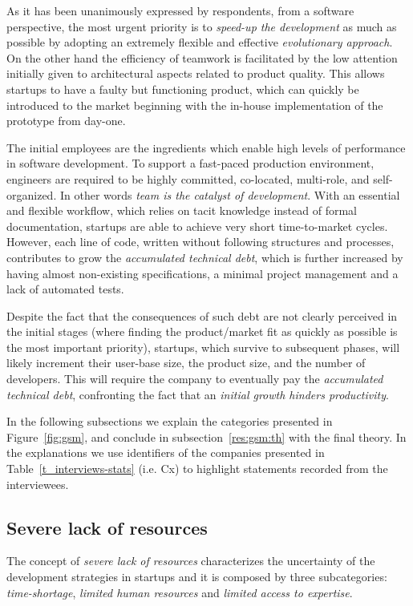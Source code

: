 \documentclass[10pt,journal,letterpaper,compsoc]{IEEEtran}
\begin{document}
As it has been unanimously expressed by respondents, from a software
perspective, the most urgent priority is to \textit{speed-up the development} as
much as possible by adopting an extremely flexible and effective
\textit{evolutionary approach}. On the other hand the efficiency of teamwork is
facilitated by the low attention initially given to architectural aspects
related to product quality. This allows startups to have a faulty but
functioning product, which can quickly be introduced to the market beginning
with the in-house implementation of the prototype from day-one.

The initial employees are the ingredients which enable high levels of
performance in software development. To support a fast-paced production
environment, engineers are required to be highly committed, co-located, 
multi-role, and self-organized. In other words \textit{team is the catalyst of
development}. With an essential and flexible workflow, which relies on tacit
knowledge instead of formal documentation, startups are able to achieve very
short time-to-market cycles. However, each line of code, written without
following structures and processes, contributes to grow the \textit{accumulated
technical debt}, which is further increased by having almost non-existing
specifications, a minimal project management and a lack of automated tests.

Despite the fact that the consequences of such debt are not clearly perceived
in the initial stages (where finding the product/market fit as quickly as
possible is the most important priority), startups, which survive to subsequent
phases, will likely increment their user-base size, the product size, and the
number of developers. This will require the company to eventually pay the
\textit{accumulated technical debt}, confronting the fact that an
\textit{initial growth hinders productivity}.

In the following subsections we explain the categories presented in 
Figure~\ref{fig:gsm}, and conclude in subsection~\ref{res:gsm:th} with the
final theory. In the explanations we use identifiers of the companies presented
in Table~\ref{t_interviews-stats} (i.e. Cx) to highlight statements recorded
from the interviewees.

\subsection{Severe lack of resources}\label{res:gsm:cat7} 
The concept of \textit{severe lack of resources} characterizes the uncertainty 
of the development strategies in startups and it is composed by 
three subcategories: \textit{time-shortage}, \textit{limited human resources} 
and \textit{limited access to expertise}.
\end{document}
